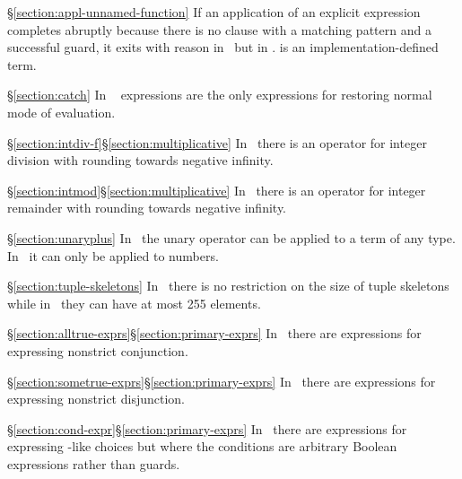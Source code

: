 \begin{Lentry}
\item[\S\ref{section:appl-unnamed-function}]
If an application of an explicit  expression completes
abruptly because there is no clause with a matching pattern and a successful
guard, it exits with reason
in \StdErlang\ but
in \OldErlang.   is an implementation-defined term.

\item[\S\ref{section:catch}]
In \OldErlang\  expressions are the only expressions for restoring
normal mode of evaluation.

\item[\ifStd\S\ref{section:intdiv-f}\fi\ifOld\S\ref{section:multiplicative}\fi]
In \StdErlang\ there is an operator \T{//} for integer division with rounding
towards negative infinity.

\item[\ifStd\S\ref{section:intmod}\fi\ifOld\S\ref{section:multiplicative}\fi]
In \StdErlang\ there is an operator  for integer remainder with rounding
towards negative infinity.

\item[\S\ref{section:unaryplus}]
In \OldErlang\ the unary \T{+} operator can be applied to a term of any type.
In \StdErlang\ it can only be applied to numbers.

\item[\S\ref{section:tuple-skeletons}]
In \StdErlang\ there is no restriction on the size of tuple skeletons while in
\OldErlang\ they can have at most 255 elements.

\item[\ifStd\S\ref{section:alltrue-exprs}\fi\ifOld\S\ref{section:primary-exprs}\fi]
In \StdErlang\ there are expressions 
for expressing nonstrict conjunction.

\item[\ifStd\S\ref{section:sometrue-exprs}\fi\ifOld\S\ref{section:primary-exprs}\fi]
In \StdErlang\ there are expressions 
for expressing nonstrict disjunction.

\item[\ifStd\S\ref{section:cond-expr}\fi\ifOld\S\ref{section:primary-exprs}\fi]
In \StdErlang\ there are  expressions
for expressing -like choices but where the conditions are arbitrary Boolean
expressions rather than guards.


\end{Lentry}
